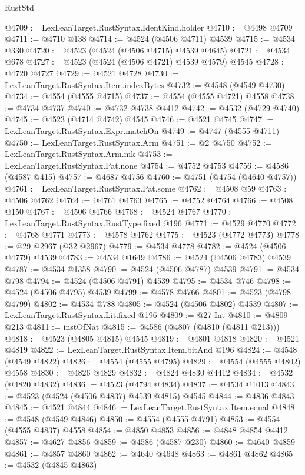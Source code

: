 \begin{lexlean}{RustStd}
\begin{coremodule}
@4709 := LexLeanTarget.RustSyntax.IdentKind.holder
@4710 := @4498 @4709
@4711 := @4710 @138
@4714 := @4524 (@4506 @4711) @4539
@4715 := @4534 @330
@4720 := @4523 (@4524 (@4506 @4715) @4539 @4645)
@4721 := @4534 @678
@4727 := @4523 (@4524 (@4506 @4721) @4539 @4579) @4545
@4728 := @4720 @4727
@4729 := @4521 @4728
@4730 := LexLeanTarget.RustSyntax.Item.indexBytes
@4732 := @4548 (@4549 @4730)
@4734 := @4554 (@4555 @4715)
@4737 := @4554 (@4555 @4721) @4558
@4738 := @4734 @4737
@4740 := @4732 @4738 @4412
@4742 := @4532 (@4729 @4740)
@4745 := @4523 (@4714 @4742) @4545
@4746 := @4521 @4745
@4747 := LexLeanTarget.RustSyntax.Expr.matchOn
@4749 := @4747 (@4555 @4711)
@4750 := LexLeanTarget.RustSyntax.Arm
@4751 := @2 @4750
@4752 := LexLeanTarget.RustSyntax.Arm.mk
@4753 := LexLeanTarget.RustSyntax.Pat.none
@4754 := @4752 @4753
@4756 := @4586 (@4587 @415)
@4757 := @4687 @4756
@4760 := @4751 (@4754 (@4640 @4757))
@4761 := LexLeanTarget.RustSyntax.Pat.some
@4762 := @4508 @59
@4763 := @4506 @4762
@4764 := @4761 @4763
@4765 := @4752 @4764
@4766 := @4508 @150
@4767 := @4506 @4766
@4768 := @4524 @4767
@4770 := LexLeanTarget.RustSyntax.RustType.fixed @196
@4771 := @4529 @4770
@4772 := @4768 @4771
@4773 := @4578 @4762
@4775 := @4523 (@4772 @4773)
@4778 := @29 @2967 (@32 @2967)
@4779 := @4534 @4778
@4782 := @4524 (@4506 @4779) @4539
@4783 := @4534 @1649
@4786 := @4524 (@4506 @4783) @4539
@4787 := @4534 @1358
@4790 := @4524 (@4506 @4787) @4539
@4791 := @4534 @798
@4794 := @4524 (@4506 @4791) @4539
@4795 := @4534 @746
@4798 := @4524 (@4506 @4795) @4539
@4799 := @4578 @4766
@4801 := @4523 (@4798 @4799)
@4802 := @4534 @788
@4805 := @4524 (@4506 @4802) @4539
@4807 := LexLeanTarget.RustSyntax.Lit.fixed @196
@4809 := @27 Int
@4810 := @4809 @213
@4811 := instOfNat
@4815 := @4586 (@4807 (@4810 (@4811 @213)))
@4818 := @4523 (@4805 @4815) @4545
@4819 := @4801 @4818
@4820 := @4521 @4819
@4822 := LexLeanTarget.RustSyntax.Item.bitAnd @196
@4824 := @4548 (@4549 @4822)
@4826 := @4554 (@4555 @4795)
@4829 := @4554 (@4555 @4802) @4558
@4830 := @4826 @4829
@4832 := @4824 @4830 @4412
@4834 := @4532 (@4820 @4832)
@4836 := @4523 (@4794 @4834)
@4837 := @4534 @1013
@4843 := @4523 (@4524 (@4506 @4837) @4539 @4815) @4545
@4844 := @4836 @4843
@4845 := @4521 @4844
@4846 := LexLeanTarget.RustSyntax.Item.equal
@4848 := @4548 (@4549 @4846)
@4850 := @4554 (@4555 @4791)
@4853 := @4554 (@4555 @4837) @4558
@4854 := @4850 @4853
@4856 := @4848 @4854 @4412
@4857 := @4627 @4856
@4859 := @4586 (@4587 @230)
@4860 := @4640 @4859
@4861 := @4857 @4860
@4862 := @4640 @4648
@4863 := @4861 @4862
@4865 := @4532 (@4845 @4863)

\end{coremodule}
\end{lexlean}
